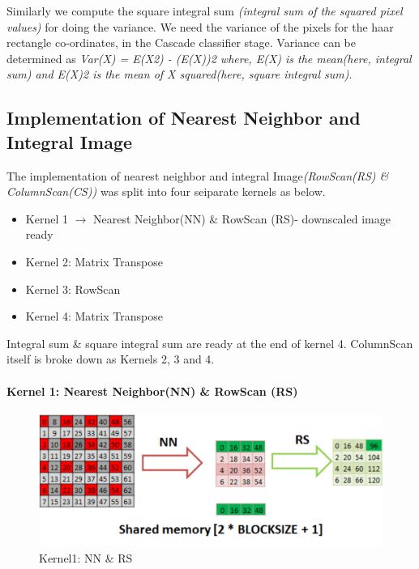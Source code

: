 Similarly we compute the square integral sum \textit{(integral sum of the squared pixel values)}
for doing the variance. We need the variance of the pixels for the haar rectangle co-ordinates, 
in the Cascade classifier stage. Variance can be determined 
as \textit{Var(X) = E(X2) - (E(X))2   
where, E(X) is the mean(here, integral sum) 
and E(X)2 is the mean of X squared(here, square integral sum)}.


\subsection{Implementation of Nearest Neighbor and Integral Image}\label{sec:impl nn II}
The implementation of nearest neighbor and integral Image\textit{(RowScan(RS) \& ColumnScan(CS)) } was 
split into four seiparate kernels as below.
\begin{itemize}
\item Kernel 1 \begin{math}\rightarrow\end{math}  Nearest Neighbor(NN) \& RowScan (RS)- downscaled image ready
    \item Kernel 2: Matrix Transpose
    \item Kernel 3:  RowScan
    \item Kernel 4:  Matrix Transpose
\end{itemize}
Integral sum \& square integral sum are ready at the end of kernel 4. ColumnScan itself is broke down as Kernels 2, 3 and 4. 

\paragraph{Kernel 1: Nearest Neighbor(NN) \& RowScan (RS)}


\begin{figure}[h]
  \centering
  \includegraphics[width=\linewidth]{figs/kernel1_crop.pdf}
  \caption{Kernel1: NN \& RS }
  \label{fig:kernel1}
\end{figure}

